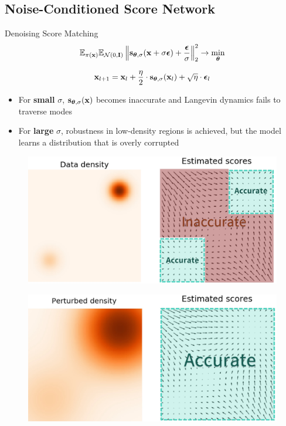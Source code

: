 \documentclass{beamer}
\begin{document}
\subsection{Noise-Conditioned Score Network}
\begin{frame}{Denoising Score Matching}
	\vspace{-0.5cm}
	\[
		\mathbb{E}_{\pi(\mathbf{x})} \mathbb{E}_{\mathcal{N}(0, \mathbf{I})}\left\| \mathbf{s}_{\boldsymbol{\theta}, \sigma}(\mathbf{x} + \sigma \boldsymbol{\epsilon}) + \frac{\boldsymbol{\epsilon}}{\sigma} \right\|_2^2 \rightarrow \min_{\boldsymbol{\theta}}
	\]
	\begin{minipage}{0.5\linewidth}
		\[
			\mathbf{x}_{l + 1} = \mathbf{x}_l + \frac{\eta}{2} \cdot \mathbf{s}_{\boldsymbol{\theta}, \sigma}(\mathbf{x}_l) + \sqrt{\eta} \cdot \boldsymbol{\epsilon}_l
		\]
		\vspace{-0.3cm}
		\begin{itemize}
			\item For \textbf{small} $\sigma$, $\mathbf{s}_{\boldsymbol{\theta}, \sigma}(\mathbf{x})$ becomes inaccurate and Langevin dynamics fails to traverse modes
			\item For \textbf{large} $\sigma$, robustness in low-density regions is achieved, but the model learns a distribution that is overly corrupted
		\end{itemize}
	\end{minipage}%
	\begin{minipage}{0.5\linewidth}
		\begin{figure}
			\includegraphics[width=\linewidth]{figs/pitfalls}
		\end{figure}
		\vspace{-0.3cm}
		\begin{figure}
			\includegraphics[width=\linewidth]{figs/single_noise}
		\end{figure}
	\end{minipage}
\end{frame}
\end{document}
